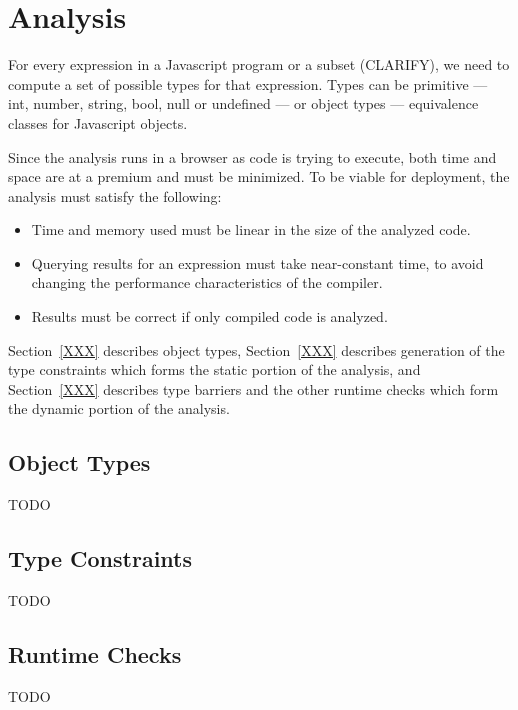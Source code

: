 
\section{Analysis}

For every expression in a Javascript program or a subset (CLARIFY),
we need to compute a set of possible types for that expression.
Types can be primitive --- int, number, string, bool, null
or undefined --- or object types --- equivalence classes for
Javascript objects.

Since the analysis runs in a browser as code is trying to execute,
both time and space are at a premium and must be minimized.
To be viable for deployment, the analysis must satisfy the following:

\begin{itemize}

\item Time and memory used must be linear in the size of the analyzed code.

\item Querying results for an expression must take near-constant time,
to avoid changing the performance characteristics of the compiler.

\item Results must be correct if only compiled code is analyzed.

\end{itemize}

Section~\ref{XXX} describes object types, Section~\ref{XXX} describes
generation of the type constraints which forms the static portion of
the analysis, and Section~\ref{XXX} describes type barriers and the
other runtime checks which form the dynamic portion of the analysis.

\subsection{Object Types}

TODO

\subsection{Type Constraints}

TODO

\subsection{Runtime Checks}

TODO

